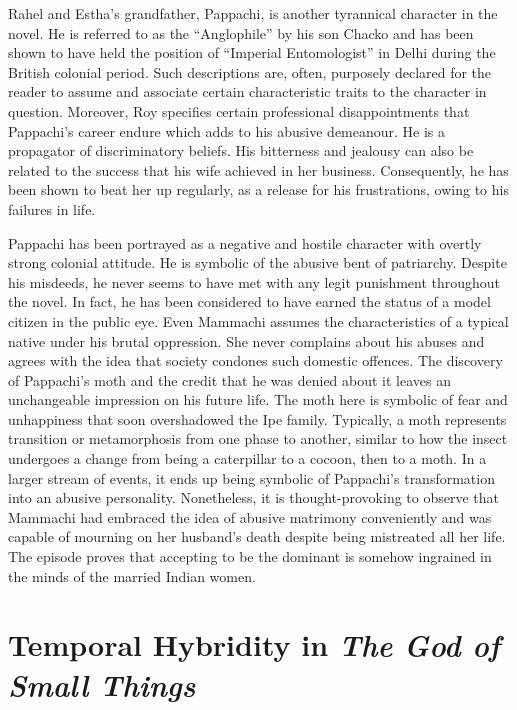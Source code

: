 Rahel and Estha's grandfather, Pappachi, is another tyrannical character in the novel. He is referred to as the ``Anglophile'' by his son Chacko and has been shown to have held the position of ``Imperial Entomologist'' in Delhi during the British colonial period. Such descriptions are, often, purposely declared for the reader to assume and associate certain characteristic traits to the character in question. Moreover, Roy specifies certain professional disappointments that Pappachi's career endure which adds to his abusive demeanour. He is a propagator of discriminatory beliefs. His bitterness and jealousy can also be related to the success that his wife achieved in her business. Consequently, he has been shown to beat her up regularly, as a release for his frustrations, owing to his failures in life.

Pappachi has been portrayed as a negative and hostile character with overtly strong colonial attitude. He is symbolic of the abusive bent of patriarchy. Despite his misdeeds, he never seems to have met with any legit punishment throughout the novel. In fact, he has been considered to have earned the status of a model citizen in the public eye. Even Mammachi assumes the characteristics of a typical native under his brutal oppression. She never complains about his abuses and agrees with the idea that society condones such domestic offences. The discovery of Pappachi's moth and the credit that he was denied about it leaves an unchangeable impression on his future life. The moth here is symbolic of fear and unhappiness that soon overshadowed the Ipe family. Typically, a moth represents transition or metamorphosis from one phase to another, similar to how the insect undergoes a change from being a caterpillar to a cocoon, then to a moth. In a larger stream of events, it ends up being symbolic of Pappachi's transformation into an abusive personality. Nonetheless, it is thought-provoking to observe that Mammachi had embraced the idea of abusive matrimony conveniently and was capable of mourning on her husband's death despite being mistreated all her life. The episode proves that accepting to be the dominant is somehow ingrained in the minds of the married Indian women. 

\section{Temporal Hybridity in \emph{The God of Small Things}}

